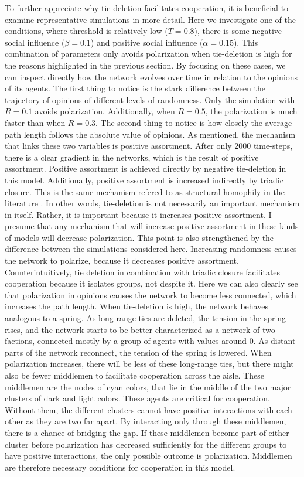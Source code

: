 \documentclass{article}
\begin{document}
To further appreciate why tie-deletion facilitates cooperation, it is beneficial to examine representative simulations in more detail. Here we investigate one of the conditions, where threshold is relatively low ($T = 0.8$), there is some negative social influence ($\beta = 0.1$) and positive social influence ($\alpha = 0.15$). This combination of parameters only avoids polarization when tie-deletion is high for the reasons highlighted in the previous section. By focusing on these cases, we can inspect directly how the network evolves over time in relation to the opinions of its agents. 
The first thing to notice is the stark difference between the trajectory of opinions of different levels of randomness. Only the simulation with $R=0.1$ avoids polarization. Additionally, when $R=0.5$, the polarization is much faster than when $R=0.3$. The second thing to notice is how closely the average path length follows the absolute value of opinions. As mentioned, the mechanism that links these two variables is positive assortment. After only 2000 time-steps, there is a clear gradient in the networks, which is the result of positive assortment. Positive assortment is achieved directly by negative tie-deletion in this model. Additionally, positive assortment is increased indirectly by triadic closure. This is the same mechanism refered to as structural homophily in the literature \cite{asikainen_cumulative_2020,peixoto_disentangling_2022}. In other words, tie-deletion is not necessarily an important mechanism in itself. Rather, it is important because it increases positive assortment. I presume that any mechanism that will increase positive assortment in these kinds of models will decrease polarization. This point is also strengthened by the difference between the simulations considered here. Increasing randomness causes the network to polarize, because it decreases positive assortment. Counterintuitively, tie deletion in combination with triadic closure facilitates cooperation because it isolates groups, not despite it. 
Here we can also clearly see that polarization in opinions causes the network to become less connected, which increases the path length. When tie-deletion is high, the network behaves analogous to a spring. As long-range ties are deleted, the tension in the spring rises, and the network starts to be better characterized as a network of two factions, connected mostly by a group of agents with values around 0. As distant parts of the network reconnect, the tension of the spring is lowered. When polarization increases, there will be less of these long-range ties, but there might also be fewer middlemen to facilitate cooperation across the aisle. These middlemen are the nodes of cyan colors, that lie in the middle of the two major clusters of dark and light colors. These agents are critical for cooperation. Without them, the different clusters cannot have positive interactions with each other as they are two far apart. By interacting only through these middlemen, there is a chance of bridging the gap. If these middlemen become part of either cluster before polarization has decreased sufficiently for the different groups to have positive interactions, the only possible outcome is polarization. Middlemen are therefore necessary conditions for cooperation in this model. 
\end{document}
